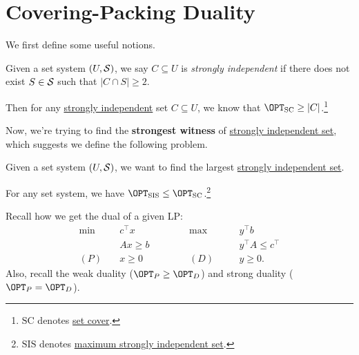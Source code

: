 \section{Covering-Packing Duality}
We first define some useful notions.
\begin{definition}\label{def:strongly-independent}
	Given a set system \((U, \mathcal{\MakeUppercase{S}} )\), we say \(C\subseteq U\) is \emph{strongly independent} if there does not exist \(S\in \mathcal{\MakeUppercase{S}} \) such that \(\left\vert C \cap S \right\vert \geq 2\).
\end{definition}

\begin{remark}
	Then for any \hyperref[def:strongly-independent]{strongly independent} set \(C\subseteq U\), we know that \(\OPT_{\mathrm{SC}} \geq \left\vert C \right\vert\).\footnote{\(\mathrm{SC}\) denotes \hyperref[prb:set-cover]{set cover}.}
\end{remark}

Now, we're trying to find the \textbf{strongest witness} of \hyperref[def:strongly-independent]{strongly independent set}, which suggests we define the following problem.

\begin{problem}\label{prb:max-strongly-independent-set}
Given a set system \((U, \mathcal{\MakeUppercase{S}} )\), we want to find the largest \hyperref[def:strongly-independent]{strongly independent set}.
\end{problem}

\begin{remark}
	For any set system, we have \(\OPT_{\mathrm{SIS}}\leq \OPT_{\mathrm{SC}}\).\footnote{\(\mathrm{SIS}\) denotes \hyperref[prb:max-strongly-independent-set]{maximum strongly independent set}.}
\end{remark}

\begin{prev}[LP dual]
	Recall how we get the dual of a given LP:
	\[
		\begin{alignedat}{5}
			\min~&c^{\top}x\qquad\qquad&&\max ~&&y^{\top} b\\
			&Ax \geq b 				&&		&&y^{\top} A\leq c^{\top} \\
			(P)\quad	&x\geq  0 	&&(D)\quad&& y\geq 0.
		\end{alignedat}
	\]
	Also, recall the weak duality (\(\OPT_{P} \geq \OPT_D\)) and strong duality (\(\OPT_P = \OPT_D\)).
\end{prev}

